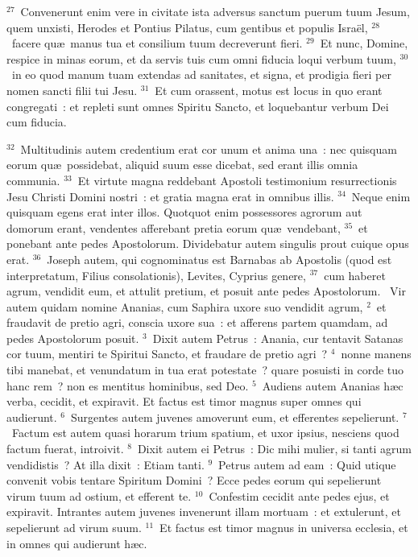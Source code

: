 ${}^{27}$~Convenerunt enim vere in civitate ista adversus sanctum puerum tuum Jesum, quem unxisti, Herodes et Pontius Pilatus, cum gentibus et populis Isra\"el,
${}^{28}$~facere qu\ae\ manus tua et consilium tuum decreverunt fieri.
${}^{29}$~Et nunc, Domine, respice in minas eorum, et da servis tuis cum omni fiducia loqui verbum tuum,
${}^{30}$~in eo quod manum tuam extendas ad sanitates, et signa, et prodigia fieri per nomen sancti filii tui Jesu.
${}^{31}$~Et cum orassent, motus est locus in quo erant congregati~: et repleti sunt omnes Spiritu Sancto, et loquebantur verbum Dei cum fiducia.


${}^{32}$~Multitudinis autem credentium erat cor unum et anima una~: nec quisquam eorum qu\ae\ possidebat, aliquid suum esse dicebat, sed erant illis omnia communia.
${}^{33}$~Et virtute magna reddebant Apostoli testimonium resurrectionis Jesu Christi Domini nostri~: et gratia magna erat in omnibus illis.
${}^{34}$~Neque enim quisquam egens erat inter illos. Quotquot enim possessores agrorum aut domorum erant, vendentes afferebant pretia eorum qu\ae\ vendebant,
${}^{35}$~et ponebant ante pedes Apostolorum. Dividebatur autem singulis prout cuique opus erat.
${}^{36}$~Joseph autem, qui cognominatus est Barnabas ab Apostolis (quod est interpretatum, Filius consolationis), Levites, Cyprius genere,
${}^{37}$~cum haberet agrum, vendidit eum, et attulit pretium, et posuit ante pedes Apostolorum.
~\lettrine[lines=10,image=true,loversize=0.05,lraise=-0.03]{V}{}ir autem quidam nomine Ananias, cum Saphira uxore suo vendidit agrum,
${}^{2}$~et fraudavit de pretio agri, conscia uxore sua~: et afferens partem quamdam, ad pedes Apostolorum posuit.
${}^{3}$~Dixit autem Petrus~: Anania, cur tentavit Satanas cor tuum, mentiri te Spiritui Sancto, et fraudare de pretio agri~?
${}^{4}$~nonne manens tibi manebat, et venundatum in tua erat potestate~? quare posuisti in corde tuo hanc rem~? non es mentitus hominibus, sed Deo.
${}^{5}$~Audiens autem Ananias h\ae c verba, cecidit, et expiravit. Et factus est timor magnus super omnes qui audierunt.
${}^{6}$~Surgentes autem juvenes amoverunt eum, et efferentes sepelierunt.
${}^{7}$~Factum est autem quasi horarum trium spatium, et uxor ipsius, nesciens quod factum fuerat, introivit.
${}^{8}$~Dixit autem ei Petrus~: Dic mihi mulier, si tanti agrum vendidistis~? At illa dixit~: Etiam tanti.
${}^{9}$~Petrus autem ad eam~: Quid utique convenit vobis tentare Spiritum Domini~? Ecce pedes eorum qui sepelierunt virum tuum ad ostium, et efferent te.
${}^{10}$~Confestim cecidit ante pedes ejus, et expiravit. Intrantes autem juvenes invenerunt illam mortuam~: et extulerunt, et sepelierunt ad virum suum.
${}^{11}$~Et factus est timor magnus in universa ecclesia, et in omnes qui audierunt h\ae c.



